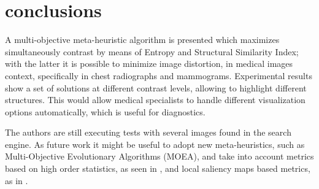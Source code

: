\documentclass[spanish,twocolumn]{article}
\begin{document}
{\section{conclusions}
\label{sec:conclusion}
A multi-objective meta-heuristic algorithm is presented which maximizes simultaneously contrast by means of Entropy and Structural Similarity Index; with the latter it is possible to minimize image distortion, in medical images context, specifically in chest radiographs and mammograms. Experimental results show a set of solutions at different contrast levels, allowing to highlight different structures. This would allow medical specialists to handle different visualization options automatically, which is useful for diagnostics.

The authors are still executing tests with several images found in the search engine. As future work it might be useful to adopt new meta-heuristics, such as Multi-Objective Evolutionary Algorithms (MOEA)\cite{coello2002evolutionary}, and take into account metrics based on high order statistics, as seen in \cite{7056527}, and local saliency maps based metrics, as in \cite{LTG}.


%


\onecolumn
\noindent\begin{minipage}[b]{1.0\linewidth}
  \centering
   

\end{minipage}}
\end{document}
